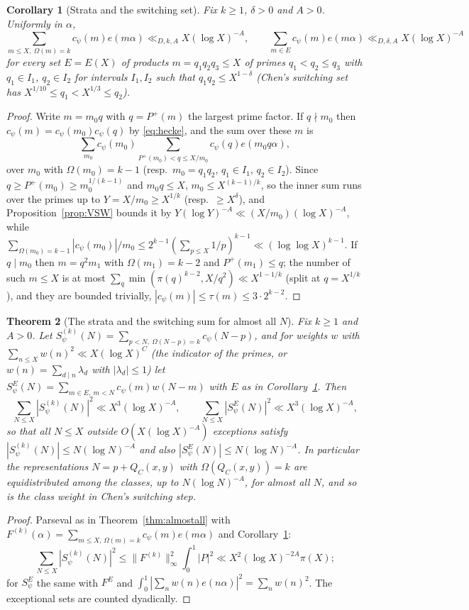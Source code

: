 \documentclass[11pt]{amsart}
\newtheorem{theorem}{Theorem}[section]
\newtheorem{corollary}[theorem]{Corollary}
\theoremstyle{remark}
\begin{document}
\begin{corollary}[Strata and the switching set]\label{cor:strata}
Fix $k\ge1$, $\delta>0$ and $A>0$. Uniformly in $\alpha$,
\[
\sum_{m\le X,\ \Omega(m)=k}c_\psi(m)e(m\alpha)\ll_{D,k,A}X(\log X)^{-A},\qquad\sum_{m\in E}c_\psi(m)e(m\alpha)\ll_{D,\delta,A}X(\log X)^{-A}
\]
for every set $E=E(X)$ of products $m=q_1q_2q_3\le X$ of primes $q_1<q_2\le q_3$ with $q_1\in I_1$, $q_2\in I_2$ for intervals $I_1,I_2$ such that $q_1q_2\le X^{1-\delta}$ (Chen's switching set has $X^{1/10}\le q_1<X^{1/3}\le q_2$).
\end{corollary}
\begin{proof}
Write $m=m_0q$ with $q=P^+(m)$ the largest prime factor. If $q\nmid m_0$ then $c_\psi(m)=c_\psi(m_0)c_\psi(q)$ by \eqref{eq:hecke}, and the sum over these $m$ is
\[
\sum_{m_0}c_\psi(m_0)\sum_{P^+(m_0)<q\le X/m_0}c_\psi(q)e(m_0q\alpha),
\]
over $m_0$ with $\Omega(m_0)=k-1$ (resp.\ $m_0=q_1q_2$, $q_1\in I_1$, $q_2\in I_2$). Since $q\ge P^+(m_0)\ge m_0^{1/(k-1)}$ and $m_0q\le X$, $m_0\le X^{(k-1)/k}$, so the inner sum runs over the primes up to $Y=X/m_0\ge X^{1/k}$ (resp.\ $\ge X^\delta$), and Proposition~\ref{prop:VSW} bounds it by $Y(\log Y)^{-A}\ll(X/m_0)(\log X)^{-A}$, while $\sum_{\Omega(m_0)=k-1}|c_\psi(m_0)|/m_0\le2^{k-1}(\sum_{p\le X}1/p)^{k-1}\ll(\log\log X)^{k-1}$. If $q\mid m_0$ then $m=q^2m_1$ with $\Omega(m_1)=k-2$ and $P^+(m_1)\le q$; the number of such $m\le X$ is at most $\sum_q\min(\pi(q)^{k-2},X/q^2)\ll X^{1-1/k}$ (split at $q=X^{1/k}$), and they are bounded trivially, $|c_\psi(m)|\le\tau(m)\le3\cdot2^{k-2}$.
\end{proof}

\begin{theorem}[The strata and the switching sum for almost all $N$]\label{thm:strata}
Fix $k\ge1$ and $A>0$. Let $S^{(k)}_\psi(N)=\sum_{p<N,\ \Omega(N-p)=k}c_\psi(N-p)$, and for weights $w$ with $\sum_{n\le X}w(n)^2\ll X(\log X)^C$ (the indicator of the primes, or $w(n)=\sum_{d\mid n}\lambda_d$ with $|\lambda_d|\le1$) let $S^E_\psi(N)=\sum_{m\in E,\ m<N}c_\psi(m)w(N-m)$ with $E$ as in Corollary~\ref{cor:strata}. Then
\[
\sum_{N\le X}|S^{(k)}_\psi(N)|^2\ll X^3(\log X)^{-A},\qquad\sum_{N\le X}|S^E_\psi(N)|^2\ll X^3(\log X)^{-A},
\]
so that all $N\le X$ outside $O(X(\log X)^{-A})$ exceptions satisfy $|S^{(k)}_\psi(N)|\le N(\log N)^{-A}$ and also $|S^E_\psi(N)|\le N(\log N)^{-A}$. In particular the representations $N=p+Q_C(x,y)$ with $\Omega(Q_C(x,y))=k$ are equidistributed among the classes, up to $N(\log N)^{-A}$, for almost all $N$, and so is the class weight in Chen's switching step.
\end{theorem}
\begin{proof}
Parseval as in Theorem~\ref{thm:almostall} with $F^{(k)}(\alpha)=\sum_{m\le X,\,\Omega(m)=k}c_\psi(m)e(m\alpha)$ and Corollary~\ref{cor:strata}:
\[
\sum_{N\le X}|S^{(k)}_\psi(N)|^2\le\|F^{(k)}\|_\infty^2\int_0^1|P|^2\ll X^2(\log X)^{-2A}\pi(X);
\]
for $S^E_\psi$ the same with $F^E$ and $\int_0^1|\sum_nw(n)e(n\alpha)|^2=\sum_nw(n)^2$. The exceptional sets are counted dyadically.
\end{proof}
\end{document}
